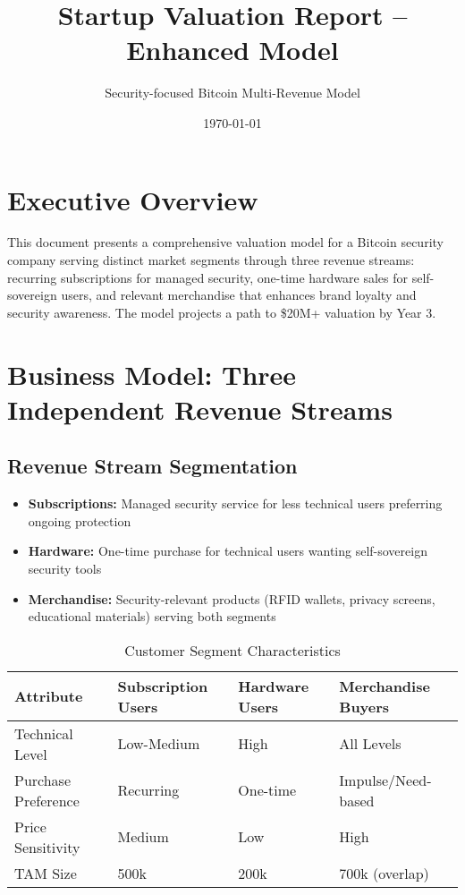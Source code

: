 \documentclass[11pt]{article}
\begin{document}
\title{Startup Valuation Report -- Enhanced Model}
\author{Security-focused Bitcoin Multi-Revenue Model}
\date{\today}
\maketitle

\section*{Executive Overview}
This document presents a comprehensive valuation model for a Bitcoin security company serving distinct market segments through three revenue streams: recurring subscriptions for managed security, one-time hardware sales for self-sovereign users, and relevant merchandise that enhances brand loyalty and security awareness. The model projects a path to \$20M+ valuation by Year 3.

\section{Business Model: Three Independent Revenue Streams}

\subsection{Revenue Stream Segmentation}
\begin{itemize}
  \item \textbf{Subscriptions:} Managed security service for less technical users preferring ongoing protection
  \item \textbf{Hardware:} One-time purchase for technical users wanting self-sovereign security tools
  \item \textbf{Merchandise:} Security-relevant products (RFID wallets, privacy screens, educational materials) serving both segments
\end{itemize}

\begin{table}[htbp]
\centering
\caption{Customer Segment Characteristics}
\begin{tabularx}{\linewidth}{l X X X}
\toprule
Attribute & Subscription Users & Hardware Users & Merchandise Buyers \\\midrule
Technical Level & Low-Medium & High & All Levels \\
Purchase Preference & Recurring & One-time & Impulse/Need-based \\
Price Sensitivity & Medium & Low & High \\
TAM Size & 500k & 200k & 700k (overlap) \\
\bottomrule
\end{tabularx}
\end{table}
\end{document}
